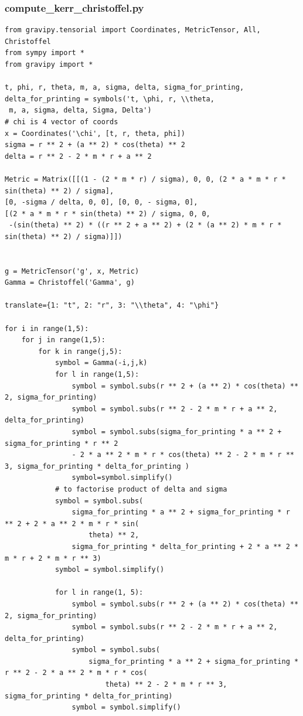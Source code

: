 \documentclass[10pt,a4paper]{report}
\begin{document}
\subsubsection*{compute\_kerr\_christoffel.py}
\small
\begin{verbatim}
from gravipy.tensorial import Coordinates, MetricTensor, All, Christoffel
from sympy import *
from gravipy import *

t, phi, r, theta, m, a, sigma, delta, sigma_for_printing, delta_for_printing = symbols('t, \phi, r, \\theta,
 m, a, sigma, delta, Sigma, Delta')
# chi is 4 vector of coords
x = Coordinates('\chi', [t, r, theta, phi])
sigma = r ** 2 + (a ** 2) * cos(theta) ** 2
delta = r ** 2 - 2 * m * r + a ** 2

Metric = Matrix([[(1 - (2 * m * r) / sigma), 0, 0, (2 * a * m * r * sin(theta) ** 2) / sigma], 
[0, -sigma / delta, 0, 0], [0, 0, - sigma, 0], 
[(2 * a * m * r * sin(theta) ** 2) / sigma, 0, 0,
 -(sin(theta) ** 2) * ((r ** 2 + a ** 2) + (2 * (a ** 2) * m * r * sin(theta) ** 2) / sigma)]])


g = MetricTensor('g', x, Metric)
Gamma = Christoffel('Gamma', g)

translate={1: "t", 2: "r", 3: "\\theta", 4: "\phi"}

for i in range(1,5):
    for j in range(1,5):
        for k in range(j,5):
            symbol = Gamma(-i,j,k)
            for l in range(1,5):
                symbol = symbol.subs(r ** 2 + (a ** 2) * cos(theta) ** 2, sigma_for_printing)
                symbol = symbol.subs(r ** 2 - 2 * m * r + a ** 2, delta_for_printing)
                symbol = symbol.subs(sigma_for_printing * a ** 2 + sigma_for_printing * r ** 2 
                - 2 * a ** 2 * m * r * cos(theta) ** 2 - 2 * m * r ** 3, sigma_for_printing * delta_for_printing )
                symbol=symbol.simplify()
            # to factorise product of delta and sigma
            symbol = symbol.subs(
                sigma_for_printing * a ** 2 + sigma_for_printing * r ** 2 + 2 * a ** 2 * m * r * sin(
                    theta) ** 2,
                sigma_for_printing * delta_for_printing + 2 * a ** 2 * m * r + 2 * m * r ** 3)
            symbol = symbol.simplify()

            for l in range(1, 5):
                symbol = symbol.subs(r ** 2 + (a ** 2) * cos(theta) ** 2, sigma_for_printing)
                symbol = symbol.subs(r ** 2 - 2 * m * r + a ** 2, delta_for_printing)
                symbol = symbol.subs(
                    sigma_for_printing * a ** 2 + sigma_for_printing * r ** 2 - 2 * a ** 2 * m * r * cos(
                        theta) ** 2 - 2 * m * r ** 3, sigma_for_printing * delta_for_printing)
                symbol = symbol.simplify()


\end{verbatim}
\end{document}
